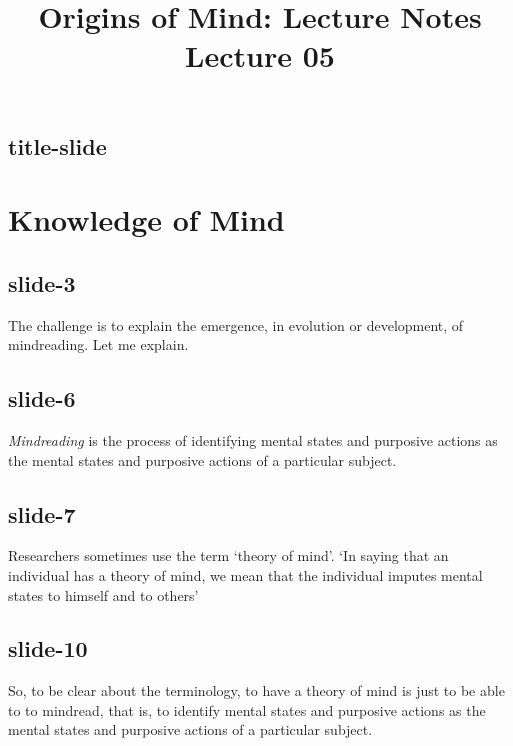 \documentclass[12pt,\papersize]{extarticle}
\begin{document}
\setlength\footnotesep{1em}








\title {Origins of Mind: Lecture Notes \\ Lecture 05}
 
\maketitle
 
 
\subsection{title-slide}
 
\section{Knowledge of Mind}
 
 
\subsection{slide-3}
The challenge is to explain the emergence, in evolution or development, of mindreading.
Let me explain.
 
 
\subsection{slide-6}
\textit{Mindreading} is the process of identifying mental states and purposive actions as the mental states and purposive actions of a particular subject.
 
 
\subsection{slide-7}
Researchers sometimes use the term ‘theory of mind’.
‘In saying that an individual has a theory of mind, we mean that the individual imputes mental states to himself and to others’
\citep[p.\ 515]{premack_does_1978}
 
 
\subsection{slide-10}
So, to be clear about the terminology, to have a theory of mind is just to be able to to mindread, that is, to identify mental states and purposive actions as the mental states and purposive actions of a particular subject.
 
\end{document}

